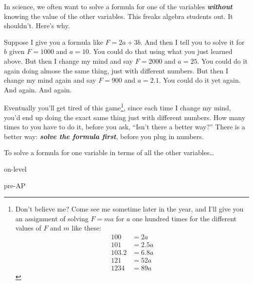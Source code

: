\newpage
In science,
we often want to solve a formula for one of the variables
{\bfseries\itshape without} knowing the value of the other variables.
This freaks algebra students out. 
It shouldn't. 
Here's why.

Suppose I give you a formula like $F = 2a + 3b$.
And then I tell you to solve it for $b$ given $F=1000$ and $a=10$.
You could do that using what you just learned above.
But then I change my mind and say $F=2000$ and $a=25$.
You could do it again doing almose the same thing, just with different numbers.
But then I change my mind again and say $F=900$ and $a=2.1$.
You could do it yet again. And again. And again.

Eventually you'll get tired of this game\footnote{
    Don't believe me? Come see me sometime later in the year, and I'll give you 
    an assignment of solving $F = ma$ for $a$ one hundred times for the different values of $F$ and $m$ like these:
    \begin{align*}
        100 &= 2a\\
        101 &= 2.5a\\
        103.2 &= 6.8a\\
        121 &= 52a\\
        1234 &= 89a
    \end{align*}
},
since each time I change my mind, you'd end up doing the exact same thing 
just with different numbers.
How many times to you have to do it, before you ask, ``Isn't there a better way?''
There is a better way: {\bfseries\itshape solve the formula first}, before you plug in numbers.

\begin{myConceptSteps}{To solve a formula for one variable in terms of all the other variables\dots}
\end{myConceptSteps}





\begin{taggedblock}{on-level}
    \end{taggedblock}
\begin{taggedblock}{pre-AP}
    \end{taggedblock}

